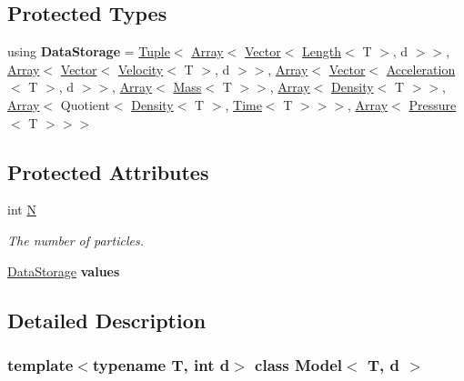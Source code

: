 \subsection*{Protected Types}
\begin{DoxyCompactItemize}
\item 
\hypertarget{classModel_a8efae0608417f70f6cb603a3f2a95649}{}\label{classModel_a8efae0608417f70f6cb603a3f2a95649} 
using {\bfseries Data\+Storage} = \hyperlink{classTuple}{Tuple}$<$ \hyperlink{classArray}{Array}$<$ \hyperlink{classVector}{Vector}$<$ \hyperlink{classBaseUnit}{Length}$<$ T $>$, d $>$$>$, \hyperlink{classArray}{Array}$<$ \hyperlink{classVector}{Vector}$<$ \hyperlink{classBaseUnit}{Velocity}$<$ T $>$, d $>$$>$, \hyperlink{classArray}{Array}$<$ \hyperlink{classVector}{Vector}$<$ \hyperlink{classBaseUnit}{Acceleration}$<$ T $>$, d $>$$>$, \hyperlink{classArray}{Array}$<$ \hyperlink{classBaseUnit}{Mass}$<$ T $>$$>$, \hyperlink{classArray}{Array}$<$ \hyperlink{classBaseUnit}{Density}$<$ T $>$$>$, \hyperlink{classArray}{Array}$<$ Quotient$<$ \hyperlink{classBaseUnit}{Density}$<$ T $>$, \hyperlink{classBaseUnit}{Time}$<$ T $>$$>$$>$, \hyperlink{classArray}{Array}$<$ \hyperlink{classBaseUnit}{Pressure}$<$ T $>$$>$$>$
\end{DoxyCompactItemize}
\subsection*{Protected Attributes}
\begin{DoxyCompactItemize}
\item 
\hypertarget{classModel_a0bd3b122b98aa25e6fc0670ed2a56800}{}\label{classModel_a0bd3b122b98aa25e6fc0670ed2a56800} 
int \hyperlink{classModel_a0bd3b122b98aa25e6fc0670ed2a56800}{N}
\begin{DoxyCompactList}\small\item\em The number of particles. \end{DoxyCompactList}\item 
\hypertarget{classModel_a55a32417414fbcc074cc85730adcbd1d}{}\label{classModel_a55a32417414fbcc074cc85730adcbd1d} 
\hyperlink{classTuple}{Data\+Storage} {\bfseries values}
\end{DoxyCompactItemize}


\subsection{Detailed Description}
\subsubsection*{template$<$typename T, int d$>$\newline
class Model$<$ T, d $>$}

